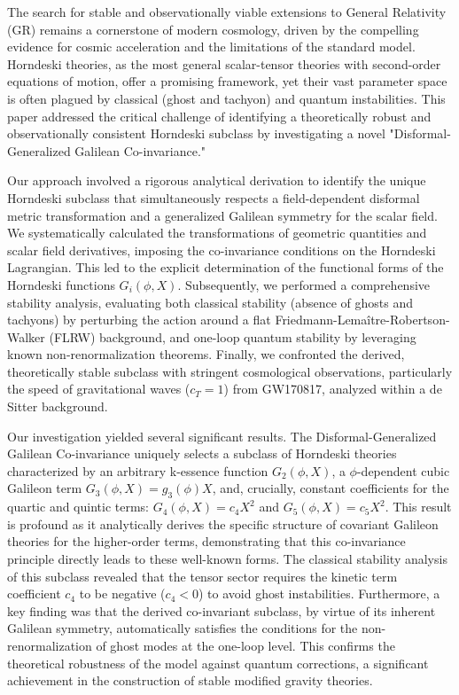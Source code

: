 \documentclass[twocolumn]{aastex631}
\begin{document}
The search for stable and observationally viable extensions to General Relativity (GR) remains a cornerstone of modern cosmology, driven by the compelling evidence for cosmic acceleration and the limitations of the standard model. Horndeski theories, as the most general scalar-tensor theories with second-order equations of motion, offer a promising framework, yet their vast parameter space is often plagued by classical (ghost and tachyon) and quantum instabilities. This paper addressed the critical challenge of identifying a theoretically robust and observationally consistent Horndeski subclass by investigating a novel "Disformal-Generalized Galilean Co-invariance."

Our approach involved a rigorous analytical derivation to identify the unique Horndeski subclass that simultaneously respects a field-dependent disformal metric transformation and a generalized Galilean symmetry for the scalar field. We systematically calculated the transformations of geometric quantities and scalar field derivatives, imposing the co-invariance conditions on the Horndeski Lagrangian. This led to the explicit determination of the functional forms of the Horndeski functions $G_i(\phi, X)$. Subsequently, we performed a comprehensive stability analysis, evaluating both classical stability (absence of ghosts and tachyons) by perturbing the action around a flat Friedmann-Lemaître-Robertson-Walker (FLRW) background, and one-loop quantum stability by leveraging known non-renormalization theorems. Finally, we confronted the derived, theoretically stable subclass with stringent cosmological observations, particularly the speed of gravitational waves ($c_T=1$) from GW170817, analyzed within a de Sitter background.

Our investigation yielded several significant results. The Disformal-Generalized Galilean Co-invariance uniquely selects a subclass of Horndeski theories characterized by an arbitrary k-essence function $G_2(\phi, X)$, a $\phi$-dependent cubic Galileon term $G_3(\phi, X) = g_3(\phi) X$, and, crucially, constant coefficients for the quartic and quintic terms: $G_4(\phi, X) = c_4 X^2$ and $G_5(\phi, X) = c_5 X^2$. This result is profound as it analytically derives the specific structure of covariant Galileon theories for the higher-order terms, demonstrating that this co-invariance principle directly leads to these well-known forms. The classical stability analysis of this subclass revealed that the tensor sector requires the kinetic term coefficient $c_4$ to be negative ($c_4 < 0$) to avoid ghost instabilities. Furthermore, a key finding was that the derived co-invariant subclass, by virtue of its inherent Galilean symmetry, automatically satisfies the conditions for the non-renormalization of ghost modes at the one-loop level. This confirms the theoretical robustness of the model against quantum corrections, a significant achievement in the construction of stable modified gravity theories.
\end{document}
